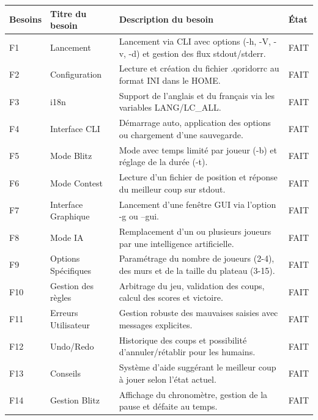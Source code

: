 \documentclass[a4paper]{article}
\begin{document}
\begin{table}[H]
    \centering
    \begin{tabular}{|p{1.5cm}|p{3cm}|p{8.5cm}|p{2cm}|}
        \hline
        \textbf{Besoins} & \textbf{Titre du besoin} & \textbf{Description du besoin} & \textbf{État} \\
        \hline
        F1 & Lancement & Lancement via CLI avec options (-h, -V, -v, -d) et gestion des flux stdout/stderr. & FAIT \\
        \hline
        F2 & Configuration & Lecture et création du fichier .qoridorrc au format INI dans le HOME. & FAIT \\
        \hline
        F3 & i18n & Support de l'anglais et du français via les variables LANG/LC\_ALL. & FAIT \\
        \hline
        F4 & Interface CLI & Démarrage auto, application des options ou chargement d'une sauvegarde. & FAIT \\
        \hline
        F5 & Mode Blitz & Mode avec temps limité par joueur (-b) et réglage de la durée (-t). & FAIT \\
        \hline
        F6 & Mode Contest & Lecture d'un fichier de position et réponse du meilleur coup sur stdout. & FAIT \\
        \hline
        F7 & Interface Graphique & Lancement d'une fenêtre GUI via l'option -g ou --gui. & FAIT \\
        \hline
        F8 & Mode IA & Remplacement d'un ou plusieurs joueurs par une intelligence artificielle. & FAIT \\
        \hline
        F9 & Options Spécifiques & Paramétrage du nombre de joueurs (2-4), des murs et de la taille du plateau (3-15). & FAIT \\
        \hline
        F10 & Gestion des règles & Arbitrage du jeu, validation des coups, calcul des scores et victoire. & FAIT \\
        \hline
        F11 & Erreurs Utilisateur & Gestion robuste des mauvaises saisies avec messages explicites. & FAIT \\
        \hline
        F12 & Undo/Redo & Historique des coups et possibilité d'annuler/rétablir pour les humains. & FAIT \\
        \hline
        F13 & Conseils & Système d'aide suggérant le meilleur coup à jouer selon l'état actuel. & FAIT \\
        \hline
        F14 & Gestion Blitz & Affichage du chronomètre, gestion de la pause et défaite au temps. & FAIT \\

\end{tabular}
\end{table}
\end{document}
